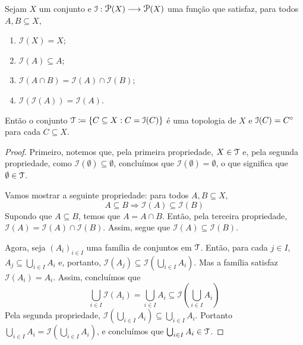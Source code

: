 \begin{prop}
	Sejam $X$ um conjunto e $\mathcal I: \p(X) \to \p(X)$ uma função que satisfaz, para todos $A,B \subseteq X$,
	\begin{enumerate}
	\item $\mathcal I(X) = X$;
	\item $\mathcal I(A) \subseteq A$;
	\item $\mathcal I(A \cap B) = \mathcal I(A) \cap \mathcal I(B)$;
	\item $\mathcal I(\mathcal I(A)) = \mathcal I(A)$.
	\end{enumerate}
	
Então o conjunto $\topo \coloneqq \{C \subseteq X : C = \mathcal I(C)\}$ é uma topologia de $X$ e $\mathcal I(C) = {C}^\circ$ para cada $C \subseteq X$.
\end{prop}
\begin{proof}
	Primeiro, notemos que, pela primeira propriedade, $X \in \mathcal{T}$ e, pela segunda propriedade, como $\mathcal I(\emptyset) \subseteq \emptyset$, concluímos que $\mathcal I(\emptyset)=\emptyset$, o que significa que $\emptyset \in \mathcal{T}$. 	
	
	Vamos mostrar a seguinte propriedade: para todos $A,B \subseteq X$,
	\begin{equation*}
	A \subseteq B \Rightarrow \mathcal I(A) \subseteq \mathcal I(B)
	\end{equation*}
Supondo que $A \subseteq B$, temos que $A = A \cap B$. Então, pela terceira propriedade, $\mathcal I(A) = \mathcal I(A) \cap \mathcal I(B)$. Assim, segue que $\mathcal I(A) \subseteq \mathcal I(B)$.	
	
Agora, seja $(A_i)_{i \in I}$ uma família de conjuntos em $\mathcal{T}$. Então, para cada $j \in I$, $A_j \subseteq \bigcup_{i \in I} A_i$ e, portanto, $\mathcal I(A_j) \subseteq \mathcal I(\bigcup_{i \in I} A_i)$. Mas a família satisfaz $\mathcal I(A_i) = A_i$. Assim, concluímos que
	\begin{equation*}
	\bigcup_{i \in I} \mathcal I(A_i) = \bigcup_{i \in I} A_i \subseteq \mathcal I \left( \bigcup_{i \in I} A_i \right)
	\end{equation*}
Pela segunda propriedade, $\mathcal I(\bigcup_{i \in I} A_i) \subseteq \bigcup_{i \in I} A_i$. Portanto $\bigcup_{i \in I} A_i = \mathcal I(\bigcup_{i \in I} A_i )$, e concluímos que $\bigcup_{i \in I} A_i \in \mathcal{T}$.
	

\end{proof}
